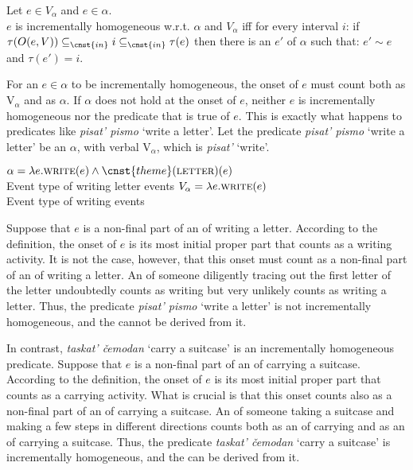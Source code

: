 \documentclass[output=paper,colorlinks,citecolor=brown,newtxmath]{langsci/langscibook}
\begin{document}
Let $e\in V_\alpha$ and $e \in \alpha$. \\
$e$ is incrementally homogeneous w.r.t. $\alpha$ and $V_\alpha$ iff for every interval $i$: if $\tau(O(e,V)) \subseteq_{\cnst{in}} i \subseteq_{\cnst{in}} \tau(e)$ then there is an  $e'$ of  $\alpha$ such that: $e' \sim e$ and $\tau(e') = i$.
\z

\noindent For an  $e \in \alpha$ to be incrementally homogeneous, the onset of $e$ must count both as  V$_\alpha$ and as  $\alpha$. If $\alpha$ does not hold at the onset of $e$, neither $e$ is incrementally homogeneous nor the predicate that is true of $e$. This is exactly what happens to predicates like \textit{pisat’ pismo} `write a letter’. Let the predicate \textit{pisat’ pismo} `write a letter’ be an  $\alpha$, with verbal  V$_\alpha$, which is \textit{pisat’} `write’.

\ea \label{ex:naumov:31} \ea
 $\alpha = \lambda e. \textsc{write}(e) \wedge \cnst{theme}(\textsc{letter})(e)$ \\
    Event type of writing letter events
\ex $V_\alpha = \lambda e. \textsc{write}(e)$ \\
    Event type of writing events
\z \z

\noindent Suppose that $e$ is a non-final part of an  of writing a letter. According to the definition, the onset of $e$ is its most initial proper part that counts as a writing activity. It is not the case, however, that this onset must count as a non-final part of an  of writing a letter. An  of someone diligently tracing out the first letter of the letter undoubtedly counts as writing but very unlikely counts as writing a letter. Thus, the predicate \textit{pisat’ pismo} `write a letter’ is not incrementally homogeneous, and the  cannot be derived from it.

In contrast, \textit{taskat’ čemodan} `carry a suitcase’ is an incrementally homogeneous predicate. Suppose that $e$ is a non-final part of an  of carrying a suitcase. According to the definition, the onset of $e$ is its most initial proper part that counts as a carrying activity. What is crucial is that this onset counts also as a non-final part of an  of carrying a suitcase. An  of someone taking a suitcase and making a few steps in different directions counts both as an  of carrying and as an  of carrying a suitcase. Thus, the predicate\textit{ taskat’ čemodan} `carry a suitcase’ is incrementally homogeneous, and the  can be derived from it.
\end{document}
